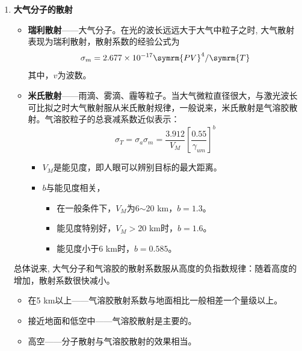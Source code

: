 \begin{enumerate}
\begin{enumerate}
\begin{itemize}
					\item 对10.6 μm的\ce{CO2}激光，必须考虑水汽和的连续吸收。
					\item 对10.6 μm的YAG激光，其连续吸收可以不加考虑。
				\end{itemize}
				在大气窗口内，水汽的连续吸收必须十分注意的。
		\end{enumerate} %
	\item \textbf{大气分子的散射}
		\begin{itemize}
			\item \textbf{瑞利散射}——大气分子。在光的波长远远大于大气中粒子之时, 大气散射表现为瑞利散射，散射系数的经验公式为
				\begin{equation}
				\sigma_m = 2.677 \times 10^{-17} \symrm{PV}^4/\symrm{T}
				\end{equation}
				其中，$ v $为波数。
			\item \textbf{米氏散射}——雨滴、雾滴、霾等粒子。当大气微粒直径很大，与激光波长可比拟之时大气散射服从米氏散射规律，一般说来，米氏散射是气溶胶散射。气溶胶粒子的总衰减系数近似表示：
				\begin{equation}
				\sigma_T = \sigma_a \sigma_m = \dfrac{3.912}{V_M} \left[\dfrac{0.55}{\gamma_{um}}\right]^b
				\end{equation}
				\begin{itemize}
					\item $ V_M $是能见度，即人眼可以辨别目标的最大距离。
					\item $ b $与能见度相关，
						\begin{itemize}
							\item 在一般条件下，$ V_M $为6$ \sim $20 km，$ b=1.3 $。
							\item 能见度特别好，$ V_M > $20 km时，$ b=1.6 $。
							\item 能见度小于6 km时，$ b = 0.585 $。 
						\end{itemize} %
				\end{itemize} %
		\end{itemize} %
		总体说来, 大气分子和气溶胶的散射系数服从高度的负指数规律：随着高度的增加，散射系数很快减小。
		\begin{itemize}
			\item 在5 km以上——气溶胶散射系数与地面相比一般相差一个量级以上。
			\item 接近地面和低空中——气溶胶散射是主要的。
			\item 高空——分子散射与气溶胶散射的效果相当。
		\end{itemize}
\end{enumerate} %


